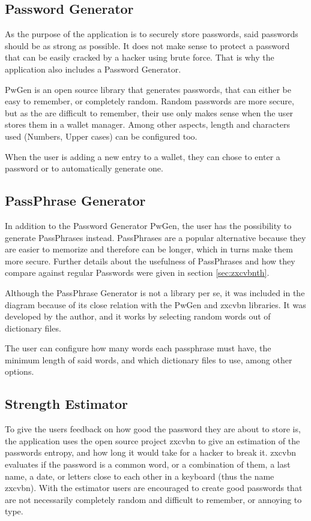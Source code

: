 \subsection{Password Generator}
As the purpose of the application is to securely store passwords, said passwords should be as strong as possible. It does not make sense to protect a password that can be easily cracked by a hacker using brute force. That is why the application also includes a Password Generator.

PwGen \cite{pwgen} is an open source library that generates passwords, that can either be easy to remember, or completely random. Random passwords are more secure, but as the are difficult to remember, their use only makes sense when the user stores them in a wallet manager. Among other aspects, length and characters used (Numbers, Upper cases) can be configured too.

When the user is adding a new entry to a wallet, they can chose to enter a password or to automatically generate one.

\subsection{PassPhrase Generator}
In addition to the Password Generator PwGen, the user has the possibility to generate PassPhrases instead. PassPhrases are a popular alternative because they are easier to memorize and therefore can be longer, which in turns make them more secure. Further details about the usefulness of PassPhrases and how they compare against regular Passwords were given in section \ref{sec:zxcvbnth}.

Although the PassPhrase Generator is not a library per se, it was included in the diagram because of its close relation with the PwGen and zxcvbn \cite{zxgit} libraries. It was developed by the author, and it works by selecting random words out of dictionary files. 

The user can configure how many words each passphrase must have, the minimum length of said words, and which dictionary files to use, among other options.

\subsection{Strength Estimator}
To give the users feedback on how good the password they are about to store is, the application uses the open source project zxcvbn to give an estimation of the passwords entropy, and how long it would take for a hacker to break it. zxcvbn evaluates if the password is a common word, or a combination of them, a last name, a date, or letters close to each other in a keyboard (thus the name zxcvbn). With the estimator users are encouraged to create good passwords that are not necessarily completely random and difficult to remember, or annoying to type.


